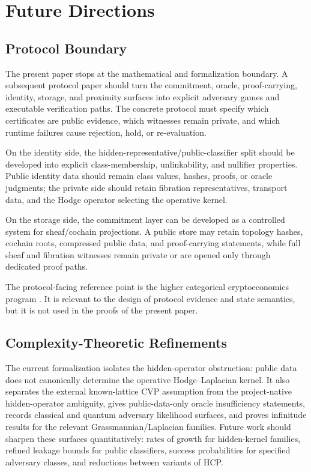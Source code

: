 \section{Future Directions}

\subsection{Protocol Boundary}

The present paper stops at the mathematical and formalization boundary. A
subsequent protocol paper should turn the commitment, oracle, proof-carrying,
identity, storage, and proximity surfaces into explicit adversary games and
executable verification paths. The concrete protocol must specify which
certificates are public evidence, which witnesses remain private, and which
runtime failures cause rejection, hold, or re-evaluation.

On the identity side, the hidden-representative/public-classifier split should
be developed into explicit class-membership, unlinkability, and nullifier
properties. Public identity data should remain class values, hashes, proofs, or
oracle judgments; the private side should retain fibration representatives,
transport data, and the Hodge operator selecting the operative kernel.

On the storage side, the commitment layer can be developed as a controlled
system for sheaf/cochain projections. A public store may retain topology
hashes, cochain roots, compressed public data, and proof-carrying statements, while
full sheaf and fibration witnesses remain private or are opened only through
dedicated proof paths.

The protocol-facing reference point is the higher categorical cryptoeconomics
program \cite{higherCategoricalCryptoeconomics}. It is relevant to the design
of protocol evidence and state semantics, but it is not used in the proofs of
the present paper.

\subsection{Complexity-Theoretic Refinements}

The current formalization isolates the hidden-operator obstruction: public data
does not canonically determine the operative Hodge--Laplacian kernel. It also
separates the external known-lattice CVP assumption from the project-native
hidden-operator ambiguity, gives public-data-only oracle insufficiency
statements, records classical and quantum adversary likelihood surfaces, and
proves infinitude results for the relevant Grassmannian/Laplacian families.
Future work should sharpen these surfaces quantitatively: rates of growth for
hidden-kernel families, refined leakage bounds for public classifiers, success
probabilities for specified adversary classes, and reductions between variants
of HCP.
